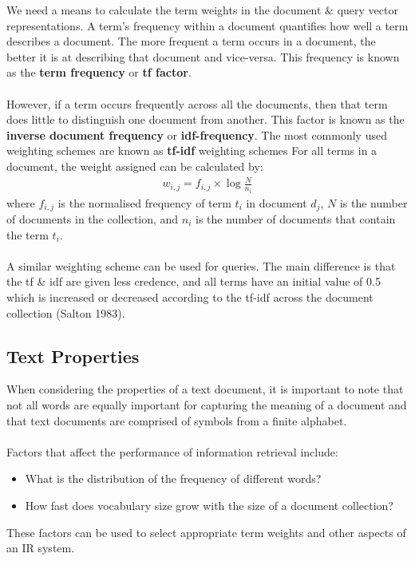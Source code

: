 \documentclass[a4paper,11pt]{article}
\begin{document}
We need a means to calculate the term weights in the document \& query vector representations.
A term's frequency within a document quantifies how well a term describes a document.
The more frequent a term occurs in a document, the better it is at describing that document and vice-versa.
This frequency is known as the \textbf{term frequency} or \textbf{tf factor}.
\\\\
However, if a term occurs frequently across all the documents, then that term does little to distinguish one document from another.
This factor is known as the \textbf{inverse document frequency} or \textbf{idf-frequency}.
The most commonly used weighting schemes are known as \textbf{tf-idf} weighting schemes
For all terms in a document, the weight assigned can be calculated by:
\begin{align*}
    w_{i,j} = f_{i,j} \times \log \frac{N}{n_i}
\end{align*}
where $f_{i,j}$ is the normalised frequency of term $t_i$ in document $d_j$, $N$ is the number of documents in the collection, and $n_i$ is the number of documents that contain the term $t_i$.
\\\\
A similar weighting scheme can be used for queries.
The main difference is that the tf \& idf are given less credence, and all terms have an initial value of 0.5 which is increased or decreased according to the tf-idf across the document collection (Salton 1983).

\subsection{Text Properties}
When considering the properties of a text document, it is important to note that not all words are equally important for capturing the meaning of a document and that text documents are comprised of symbols from a finite alphabet.
\\\\
Factors that affect the performance of information retrieval include:
\begin{itemize}
    \item   What is the distribution of the frequency of different words?
    \item   How fast does vocabulary size grow with the size of a document collection?
\end{itemize}

These factors can be used to select appropriate term weights and other aspects of an IR system.
\end{document}

